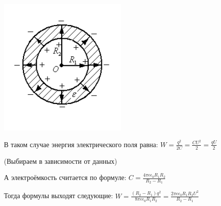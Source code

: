 \documentclass[12pt]{report}
\begin{document}
\begin{center}
    \includegraphics{graphics/t16.PNG}
\end{center}

В таком случае энергия электрического поля равна: $W = \frac{q^2}{2C} = \frac{C U^2}{2} = \frac{qU}{2}$

(Выбираем в зависимости от данных)

А электроёмкость считается по формуле: $C = \frac{4 \pi \epsilon \epsilon_0 R_1 R_2}{R_2 - R_1}$

Тогда формулы выходят следующие: $W = \frac{(R_2 - R_1) q^2}{8 \pi \epsilon \epsilon_0 R_1 R_2} = \frac{2 \pi \epsilon \epsilon_0 R_1 R_2 U^2}{R_2 - R_1}$

\setcounter{section}{20}
\end{document}
